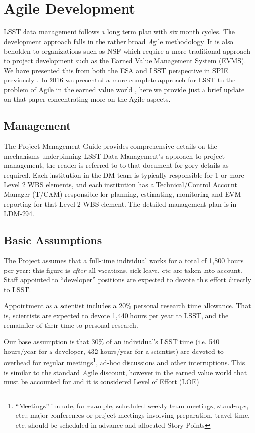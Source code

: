 \section{Agile Development}\label{sec:agile}

LSST data management follows a long term plan with six month cycles. The  development approach falls in the rather  broad {\emph Agile} methodology. It is also beholden to organizations such as NSF which require a more traditional approach to project development such as the Earned Value Management System (EVMS).
We have presented this from both  the ESA and LSST perspective in SPIE previously  \cite{2014SPIE.9150E..1EG}.
In 2016  we presented a more complete approach for LSST to the problem of Agile in the earned value world \cite{2016SPIE.9911E..0NK}, here we provide just a brief update on that paper concentrating more on the Agile aspects.


\subsection{Management}
The Project Management Guide \cite{DMTN-020} provides  comprehensive details on the mechanisms underpinning LSST Data Management’s approach to project management, the reader is referred to to that document for gory details as required.
Each institution in the DM team is typically
responsible for 1 or more Level 2 WBS elements, and each institution has a Technical/Control Account Manager
(T/CAM) responsible for planning, estimating, monitoring and EVM reporting for that Level 2 WBS element.
The detailed management plan is in LDM-294\cite{LDM-294}.

\subsection{Basic Assumptions}
The Project assumes that a full-time individual works for a total of
1,800 hours per year: this figure is \emph{after} all vacations, sick
leave, etc are taken into account. Staff appointed to ``developer''
positions are expected to devote this effort directly to LSST.

Appointment as a {\emph scientist} includes a 20\% personal research time
allowance. That is, scientists are expected to devote 1,440 hours per
year to LSST, and the remainder of their time to personal research.

Our base assumption is that 30\% of an individual's LSST time (i.e. 540 hours/year for a developer, 432 hours/year for a scientist) are devoted to overhead for regular meetings\footnote{``Meetings'' include, for example, scheduled weekly team meetings, stand-ups, etc.; major conferences or project meetings involving preparation, travel time, etc. should be scheduled in advance and allocated Story Points}, ad-hoc discussions and other interruptions.
This is similar to the standard {\emph Agile} discount, however in the earned value world that must be accounted for and it is considered Level of Effort (LOE)


